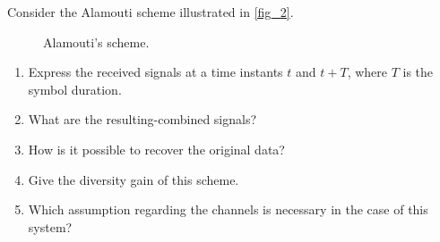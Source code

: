 \documentclass [a4paper, 11pt] {article}
\begin{document}
    \begin{exercise}{4}
    Consider the Alamouti scheme illustrated in \autoref{fig_2}.
    
    \begin{figure}[H]
    \centering
    
    \caption{Alamouti's scheme.}
    \label{fig_2}
    \end{figure}
    
    \begin{enumerate}
    \item Express the received signals at a time instants $t$ and $t + T$, where $T$ is the symbol duration. 
    \item What are the resulting-combined signals? 
    \item How is it possible to recover the original data?
    \item Give the diversity gain of this scheme.
    \item Which assumption regarding the channels is necessary in the case of this system?
    \end{enumerate}
    \end{exercise}
    
\end{document}
